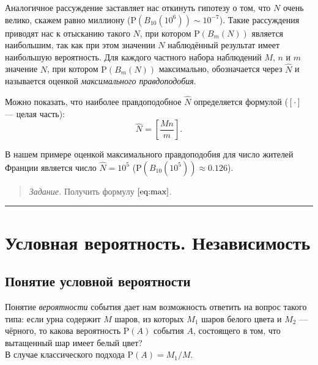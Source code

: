 \documentclass[11pt,a4paper]{article}
\begin{document}
Аналогичное рассуждение заставляет нас откинуть гипотезу о том, что
\(N\) очень велико, скажем равно миллиону
(\(\mathrm{P}(B_{10}(10^6)) \sim 10^{-7}\)). Такие рассуждения приводят
нас к отысканию такого \(N\), при котором \(\mathrm{P}(B_m(N))\)
является наибольшим, так как при этом значении \(N\) наблюдённый
результат имеет наибольшую вероятность. Для каждого частного набора
наблюдений \(M\), \(n\) и \(m\) значение \(N\), при котором
\(\mathrm{P}(B_m(N))\) максимально, обозначается через \(\hat{N}\) и
называется оценкой \emph{максимального правдоподобия}.

Можно показать, что наиболее правдоподобное \(\hat{N}\) определяется
формулой (\([\cdot]\) --- целая часть):
\[ \hat{N} = \left[\dfrac{Mn}{m}\right]. \tag{2}\label{eq:max} \]

В нашем примере оценкой максимального правдоподобия для число жителей
Франции является число \(\hat{N} = 10^5\)
(\(\mathrm{P}(B_{10}(10^5)) \approx 0.126\)).

\begin{quote}
\emph{Задание.} Получить формулу \(\eqref{eq:max}\).
\end{quote}

    \begin{center}\rule{0.5\linewidth}{\linethickness}\end{center}

    \hypertarget{ux443ux441ux43bux43eux432ux43dux430ux44f-ux432ux435ux440ux43eux44fux442ux43dux43eux441ux442ux44c.-ux43dux435ux437ux430ux432ux438ux441ux438ux43cux43eux441ux442ux44c}{%
\section{Условная вероятность.
Независимость}\label{ux443ux441ux43bux43eux432ux43dux430ux44f-ux432ux435ux440ux43eux44fux442ux43dux43eux441ux442ux44c.-ux43dux435ux437ux430ux432ux438ux441ux438ux43cux43eux441ux442ux44c}}

\hypertarget{ux43fux43eux43dux44fux442ux438ux435-ux443ux441ux43bux43eux432ux43dux43eux439-ux432ux435ux440ux43eux44fux442ux43dux43eux441ux442ux438}{%
\subsection{Понятие условной
вероятности}\label{ux43fux43eux43dux44fux442ux438ux435-ux443ux441ux43bux43eux432ux43dux43eux439-ux432ux435ux440ux43eux44fux442ux43dux43eux441ux442ux438}}

Понятие \emph{вероятности} события дает нам возможность ответить на
вопрос такого типа: если урна содержит \(M\) шаров, из которых \(M_1\)
шаров белого цвета и \(M_2\) --- чёрного, то какова вероятность
\(\mathrm{P}(A)\) события \(A\), состоящего в том, что вытащенный шар
имеет белый цвет?\\
В случае классического подхода \(\mathrm{P}(A) =M_1/M\).
\end{document}
